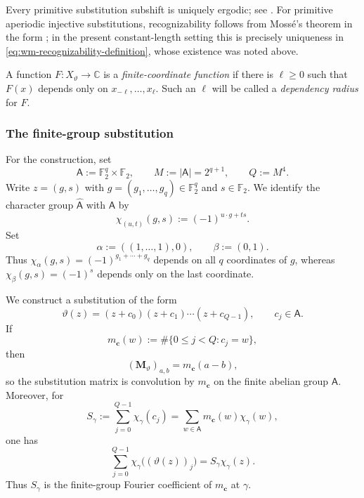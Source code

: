 \documentclass[11pt,reqno,a4paper]{amsart}
\numberwithin{equation}{section}
\theoremstyle{compact}
\theoremstyle{definition}
\theoremstyle{definition}
\begin{document}
Every primitive substitution subshift is uniquely ergodic; see
\cite[Theorem~5.6]{Que10}.  For primitive aperiodic injective substitutions,
recognizability follows from Moss\'e's theorem in the form
\cite[Theorem~4.34]{Bru22}; in the present constant-length setting this is
precisely uniqueness in \eqref{eq:wm-recognizability-definition}, whose
existence was noted above.

A function $F:X_\vartheta\to\mathbb C$ is a \emph{finite-coordinate
function} if there is $\ell\geq0$ such that $F(x)$ depends only on
$x_{-\ell},\ldots,x_\ell$.  Such an $\ell$ will be called a
\emph{dependency radius} for $F$.

\subsubsection{The finite-group substitution}
For the construction, set
\begin{equation}\label{eq:wm-finite-group}
  \mathsf A:=\mathbb F_2^q\times\mathbb F_2,
  \qquad M:=|\mathsf A|=2^{q+1},
  \qquad Q:=M^4.
\end{equation}
Write $z=(g,s)$ with $g=(g_1,\ldots,g_q)\in\mathbb F_2^q$ and
$s\in\mathbb F_2$.  We identify the character group
$\widehat{\mathsf A}$ with $\mathsf A$ by
\begin{equation}\label{eq:wm-character-identification}
  \chi_{(u,t)}(g,s):=(-1)^{u\cdot g+ts}.
\end{equation}
Set
\begin{equation}\label{eq:wm-distinguished-characters}
  \alpha:=((1,\ldots,1),0),
  \qquad
  \beta:=(0,1).
\end{equation}
Thus $\chi_\alpha(g,s)=(-1)^{g_1+\cdots+g_q}$ depends on all $q$
coordinates of $g$, whereas $\chi_\beta(g,s)=(-1)^s$ depends only on the
last coordinate.

We construct a substitution of the form
\begin{equation}\label{eq:wm-translation-form}
  \vartheta(z)=(z+c_0)(z+c_1)\cdots(z+c_{Q-1}),
  \qquad c_j\in\mathsf A.
\end{equation}
If
\[
  m_{\mathbf c}(w):=\#\{0\leq j<Q:c_j=w\},
\]
then
\begin{equation}\label{eq:wm-convolution-matrix}
  (\mathbf M_\vartheta)_{a,b}=m_{\mathbf c}(a-b),
\end{equation}
so the substitution matrix is convolution by $m_{\mathbf c}$ on the finite
abelian group $\mathsf A$.  Moreover, for
\begin{equation}\label{eq:wm-character-multiplier-predefinition}
  S_\gamma:=\sum_{j=0}^{Q-1}\chi_\gamma(c_j)
  =\sum_{w\in\mathsf A}m_{\mathbf c}(w)\chi_\gamma(w),
\end{equation}
one has
\begin{equation}\label{eq:wm-one-step-character-sum}
  \sum_{j=0}^{Q-1}\chi_\gamma\bigl((\vartheta(z))_j\bigr)
  =S_\gamma\chi_\gamma(z).
\end{equation}
Thus $S_\gamma$ is the finite-group Fourier coefficient of
$m_{\mathbf c}$ at $\gamma$.
\end{document}
